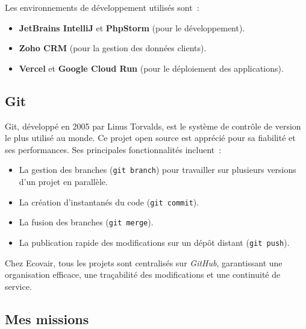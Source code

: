 Les environnements de développement utilisés sont~:\vspace{0.3cm}

\begin{itemize}
    \item \textbf{JetBrains IntelliJ} et \textbf{PhpStorm} (pour le développement).\vspace{0.3cm}
    \item \textbf{Zoho CRM} (pour la gestion des données clients).\vspace{0.3cm}
    \item \textbf{Vercel} et \textbf{Google Cloud Run} (pour le déploiement des applications).\vspace{0.3cm}
\end{itemize}

\subsection{Git}

Git, développé en 2005 par Linus Torvalds, est le système de contrôle de version le plus utilisé au monde. Ce projet open source est apprécié pour sa fiabilité et ses performances. Ses principales fonctionnalités incluent~:\vspace{0.3cm}

\begin{itemize}
    \item La gestion des branches (\texttt{git branch}) pour travailler sur plusieurs versions d’un projet en parallèle.\vspace{0.3cm}
    \item La création d’instantanés du code (\texttt{git commit}).\vspace{0.3cm}
    \item La fusion des branches (\texttt{git merge}).\vspace{0.3cm}
    \item La publication rapide des modifications sur un dépôt distant (\texttt{git push}).\vspace{0.3cm}
\end{itemize}

Chez Ecovair, tous les projets sont centralisés sur \textit{GitHub}, garantissant une organisation efficace, une traçabilité des modifications et une continuité de service.

\subsection{Mes missions}

